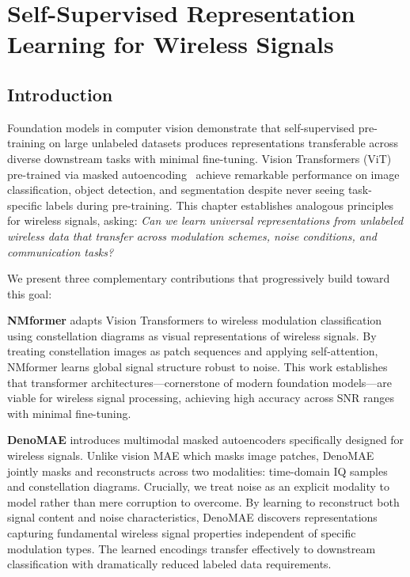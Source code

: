 \chapter{Self-Supervised Representation Learning for Wireless Signals}
\label{chap:background}

\section{Introduction}

Foundation models in computer vision demonstrate that self-supervised pre-training on large unlabeled datasets produces representations transferable across diverse downstream tasks with minimal fine-tuning. Vision Transformers (ViT) pre-trained via masked autoencoding~\cite{he2022masked} achieve remarkable performance on image classification, object detection, and segmentation despite never seeing task-specific labels during pre-training. This chapter establishes analogous principles for wireless signals, asking: \textit{Can we learn universal representations from unlabeled wireless data that transfer across modulation schemes, noise conditions, and communication tasks?}

We present three complementary contributions that progressively build toward this goal:

\textbf{NMformer} adapts Vision Transformers to wireless modulation classification using constellation diagrams as visual representations of wireless signals. By treating constellation images as patch sequences and applying self-attention, NMformer learns global signal structure robust to noise. This work establishes that transformer architectures—cornerstone of modern foundation models—are viable for wireless signal processing, achieving high accuracy across SNR ranges with minimal fine-tuning.

\textbf{DenoMAE} introduces multimodal masked autoencoders specifically designed for wireless signals. Unlike vision MAE which masks image patches, DenoMAE jointly masks and reconstructs across two modalities: time-domain IQ samples and constellation diagrams. Crucially, we treat noise as an explicit modality to model rather than mere corruption to overcome. By learning to reconstruct both signal content and noise characteristics, DenoMAE discovers representations capturing fundamental wireless signal properties independent of specific modulation types. The learned encodings transfer effectively to downstream classification with dramatically reduced labeled data requirements.

